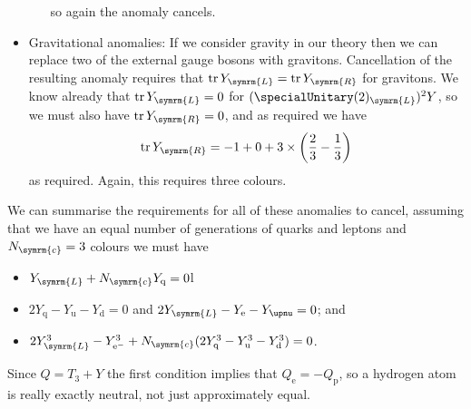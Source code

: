 \documentclass[fleqn]{NotesClass}
\newcommand{\Pparticle}[1]{\mathrm{#1}}
\newcommand{\Pu}{\ensuremath{\Pparticle{u}}}
\newcommand{\Pd}{\ensuremath{\Pparticle{d}}}
\newcommand{\Pe}{\ensuremath{\Pparticle{e}^{-}}}
\newcommand{\Pex}{\ensuremath{\Pparticle{e}}}
\newcommand{\Pnu}{\ensuremath{\upnu}}
\newcommand{\Pq}{\ensuremath{\Pparticle{q}}}
\newcommand{\Pp}{\ensuremath{\Pparticle{p}}}
\DeclareMathOperator{\tr}{tr}
\newcommand{\numberColors}{N_{\symrm{c}}}
\newcommand{\Left}{\symrm{L}}
\newcommand{\Right}{\symrm{R}}
\begin{document}
\begin{itemize}
\begin{itemize}
            so again the anomaly cancels.
        \end{itemize}
        \item Gravitational anomalies: If we consider gravity in our theory then we can replace two of the external gauge bosons with gravitons.
        Cancellation of the  resulting anomaly requires that \(\tr Y_{\Left} = \tr Y_{\Right}\) for gravitons.
        We know already that \(\tr Y_{\Left} = 0\) for \((\specialUnitary(2)_{\Left})^2 Y\), so we must also have \(\tr Y_{\Right} = 0\), and as required we have
        \begin{equation}
            \tr Y_{\Right} = -1 + 0 + 3 \times \left( \frac{2}{3} - \frac{1}{3} \right)
        \end{equation}
        as required.
        Again, this requires three colours.
    \end{itemize}
    
    We can summarise the requirements for all of these anomalies to cancel, assuming that we have an equal number of generations of quarks and leptons and \(\numberColors = 3\) colours we must have
    \begin{itemize}
        \item \(Y_{\Left} + \numberColors Y_{\Pq} = 0\)l
        \item \(2Y_{\Pq} - Y_{\Pu} - Y_{\Pd} = 0\) and \(2Y_{\Left} - Y_{\Pex} - Y_{\Pnu} = 0\); and
        \item \(2Y_{\Left}^3 - Y_{\Pe}^3 + \numberColors(2Y_{\Pq}^3 - Y_{\Pu}^3 - Y_{\Pd}^3) = 0\).
    \end{itemize}
    
    Since \(Q = T_3 + Y\) the first condition implies that \(Q_{\Pex} = -Q_{\Pp}\), so a hydrogen atom is really exactly neutral, not just approximately equal.
    
\end{document}
